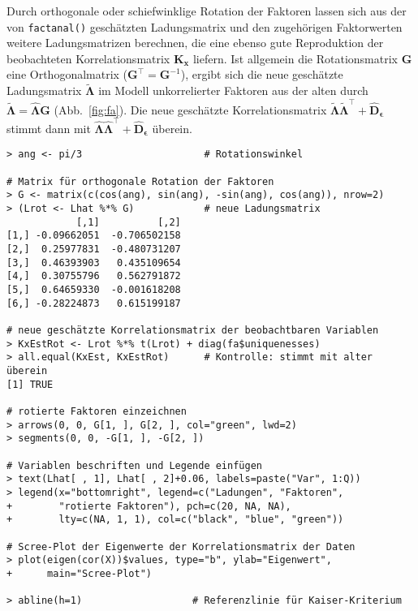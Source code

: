 Durch orthogonale oder schiefwinklige Rotation der Faktoren lassen sich aus der von \lstinline!factanal()! geschätzten Ladungsmatrix und den zugehörigen Faktorwerten weitere Ladungsmatrizen berechnen, die eine ebenso gute Reproduktion der beobachteten Korrelationsmatrix $\bm{K}_{\bm{x}}$ liefern. Ist allgemein die Rotationsmatrix $\bm{G}$ eine Orthogonalmatrix ($\bm{G}^{\top} = \bm{G}^{-1}$), ergibt sich die neue geschätzte Ladungsmatrix $\tilde{\bm{\Lambda}}$ im Modell unkorrelierter Faktoren aus der alten durch $\tilde{\bm{\Lambda}} = \hat{\bm{\Lambda}} \bm{G}$ (Abb.\ \ref{fig:fa}). Die neue geschätzte Korrelationsmatrix $\tilde{\bm{\Lambda}} \tilde{\bm{\Lambda}}^{\top} + \hat{\bm{D}}_{\bm{\epsilon}}$ stimmt dann mit $\hat{\bm{\Lambda}} \hat{\bm{\Lambda}}^{\top} + \hat{\bm{D}}_{\bm{\epsilon}}$ überein.
\begin{lstlisting}
> ang <- pi/3                     # Rotationswinkel

# Matrix für orthogonale Rotation der Faktoren
> G <- matrix(c(cos(ang), sin(ang), -sin(ang), cos(ang)), nrow=2)
> (Lrot <- Lhat %*% G)            # neue Ladungsmatrix
            [,1]          [,2]
[1,] -0.09662051  -0.706502158
[2,]  0.25977831  -0.480731207
[3,]  0.46393903   0.435109654
[4,]  0.30755796   0.562791872
[5,]  0.64659330  -0.001618208
[6,] -0.28224873   0.615199187

# neue geschätzte Korrelationsmatrix der beobachtbaren Variablen
> KxEstRot <- Lrot %*% t(Lrot) + diag(fa$uniquenesses)
> all.equal(KxEst, KxEstRot)      # Kontrolle: stimmt mit alter überein
[1] TRUE

# rotierte Faktoren einzeichnen
> arrows(0, 0, G[1, ], G[2, ], col="green", lwd=2)
> segments(0, 0, -G[1, ], -G[2, ])

# Variablen beschriften und Legende einfügen
> text(Lhat[ , 1], Lhat[ , 2]+0.06, labels=paste("Var", 1:Q))
> legend(x="bottomright", legend=c("Ladungen", "Faktoren",
+        "rotierte Faktoren"), pch=c(20, NA, NA),
+        lty=c(NA, 1, 1), col=c("black", "blue", "green"))

# Scree-Plot der Eigenwerte der Korrelationsmatrix der Daten
> plot(eigen(cor(X))$values, type="b", ylab="Eigenwert",
+      main="Scree-Plot")

> abline(h=1)                   # Referenzlinie für Kaiser-Kriterium
\end{lstlisting}

